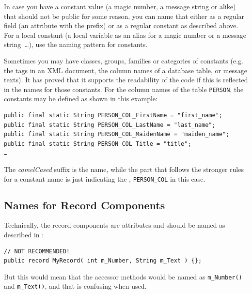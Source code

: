 In case you have a constant value (a magic number, a message string or alike) that should not be public for some reason, you can name that either as a regular field (an attribute with the  prefix) or as a regular constant as described above. For a local constant (a local variable as an alias for a magic number or a message string~…), use the naming pattern for constants. 

Sometimes you may have classes, groups, families or categories of constants (e.g. the tags in an XML document, the column names of a database table, or message texts). It has proved that it supports the readability of the code if this is reflected in the names for those constants. For the column names of the table \texttt{PERSON}, the constants may be defined as shown in this example:
\begin{lstlisting}
public final static String PERSON_COL_FirstName = "first_name";
public final static String PERSON_COL_LastName = "last_name";
public final static String PERSON_COL_MaidenName = "maiden_name";
public final static String PERSON_COL_Title = "title";
…
\end{lstlisting}
The \textit{camelCased} suffix is the  name, while the part that follows the stronger rules for a constant name is just indicating the , \texttt{PERSON\_COL} in this case.


\subsection{Names for Record Components}\label{sec:NamesOfRecordComponents}
Technically, the record components are attributes and should be named as described in :
\begin{lstlisting}
// NOT RECOMMENDED!
public record MyRecord( int m_Number, String m_Text ) {};
\end{lstlisting}
But this would mean that the accessor methods would be named as \lstinline|m_Number()| and \lstinline|m_Text()|, and that is confusing when used.

